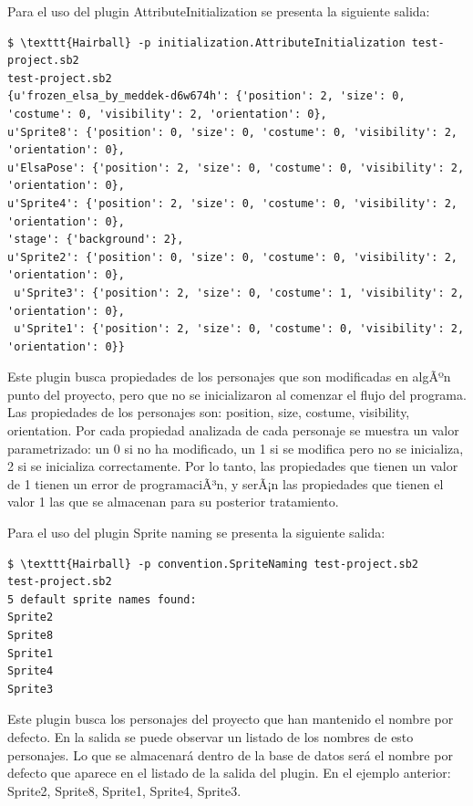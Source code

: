 \documentclass[a4paper, 12pt]{book}
\begin{document}
Para el uso del plugin AttributeInitialization se presenta la siguiente salida:

\begingroup
\fontsize{7pt}{8pt}\selectfont
\begin{verbatim}
$ \texttt{Hairball} -p initialization.AttributeInitialization test-project.sb2 
test-project.sb2
{u'frozen_elsa_by_meddek-d6w674h': {'position': 2, 'size': 0, 'costume': 0, 'visibility': 2, 'orientation': 0}, 
u'Sprite8': {'position': 0, 'size': 0, 'costume': 0, 'visibility': 2, 'orientation': 0}, 
u'ElsaPose': {'position': 2, 'size': 0, 'costume': 0, 'visibility': 2, 'orientation': 0}, 
u'Sprite4': {'position': 2, 'size': 0, 'costume': 0, 'visibility': 2, 'orientation': 0}, 
'stage': {'background': 2}, 
u'Sprite2': {'position': 0, 'size': 0, 'costume': 0, 'visibility': 2, 'orientation': 0},
 u'Sprite3': {'position': 2, 'size': 0, 'costume': 1, 'visibility': 2, 'orientation': 0},
 u'Sprite1': {'position': 2, 'size': 0, 'costume': 0, 'visibility': 2, 'orientation': 0}}
\end{verbatim}
\endgroup

Este plugin busca propiedades de los personajes que son modificadas en algÃºn punto del 
proyecto, pero que no se inicializaron al comenzar el flujo del programa. Las propiedades 
de los personajes son: position, size, costume, visibility, orientation. Por cada propiedad
analizada de cada personaje se muestra un valor parametrizado: un 0 si no ha modificado, un
1 si se modifica pero no se inicializa, 2 si se inicializa correctamente. Por lo tanto, las
propiedades que tienen un valor de 1 tienen un error de programaciÃ³n, y serÃ¡n las propiedades
que tienen el valor 1 las que se almacenan para su posterior tratamiento.


Para el uso del plugin Sprite naming se presenta la siguiente salida:

\begingroup
\fontsize{7pt}{8pt}\selectfont
\begin{verbatim}
$ \texttt{Hairball} -p convention.SpriteNaming test-project.sb2 
test-project.sb2
5 default sprite names found:
Sprite2
Sprite8
Sprite1
Sprite4
Sprite3
\end{verbatim}
\endgroup

Este plugin busca los personajes del proyecto que han mantenido el nombre por defecto. En
la salida se puede observar un listado de los nombres de esto personajes. Lo que se 
almacenará dentro de la base de datos será el nombre por defecto que aparece en el listado
de la salida del plugin. En el ejemplo anterior: Sprite2, Sprite8, Sprite1, Sprite4, Sprite3.
\end{document}
